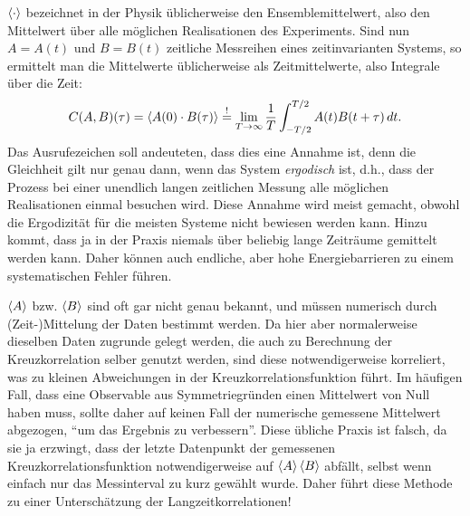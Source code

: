 $\left\langle{\cdot}\right\rangle$ bezeichnet in der Physik üblicherweise den
Ensemblemittelwert, also den Mittelwert über alle möglichen
Realisationen des Experiments. Sind nun $A=A(t)$ und $B=B(t)$
zeitliche Messreihen eines zeitinvarianten Systems, so ermittelt man
die Mittelwerte üblicherweise als Zeitmittelwerte, also Integrale über
die Zeit:
\begin{equation}
  \label{eq:crosscorrtime}
  C(A,B)(\tau) = \left\langle{A(0)\cdot B(\tau)}\right\rangle \stackrel{!}{=}
  \lim_{T\to\infty}\frac{1}{T}\int_{-T/2}^{T/2} A(t)B(t+\tau)\,dt.
\end{equation}
Das Ausrufezeichen soll andeuteten, dass dies eine Annahme ist, denn
die Gleichheit gilt nur genau dann, wenn das System \emph{ergodisch}
ist, d.h., dass der Prozess bei einer unendlich langen zeitlichen
Messung alle möglichen Realisationen einmal besuchen wird. Diese
Annahme wird meist gemacht, obwohl die Ergodizität für die meisten
Systeme nicht bewiesen werden kann. Hinzu kommt, dass ja in der Praxis
niemals über beliebig lange Zeiträume gemittelt werden kann. Daher
können auch endliche, aber hohe Energiebarrieren zu einem
systematischen Fehler führen.

$\left\langle{A}\right\rangle$ bzw. $\left\langle{B}\right\rangle$ sind oft gar nicht genau bekannt, und
müssen numerisch durch (Zeit-)Mittelung der Daten bestimmt werden. Da
hier aber normalerweise dieselben Daten zugrunde gelegt werden, die
auch zu Berechnung der Kreuzkorrelation selber genutzt werden, sind
diese notwendigerweise korreliert, was zu kleinen Abweichungen in der
Kreuzkorrelationsfunktion führt. Im häufigen Fall, dass eine
Observable aus Symmetriegründen einen Mittelwert von Null haben muss,
sollte daher auf keinen Fall der numerische gemessene Mittelwert
abgezogen, "`um das Ergebnis zu verbessern"'. Diese übliche Praxis ist
falsch, da sie ja erzwingt, dass der letzte Datenpunkt der gemessenen
Kreuzkorrelationsfunktion notwendigerweise auf $\left\langle{A}\right\rangle\left\langle{B}\right\rangle$
abfällt, selbst wenn einfach nur das Messinterval zu kurz gewählt
wurde. Daher führt diese Methode zu einer Unterschätzung der
Langzeitkorrelationen!

